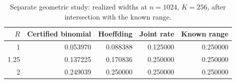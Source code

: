 \begin{table}[htbp]
\centering
\begin{tabular}{rrrrr}
\toprule
$R$ & Certified binomial & Hoeffding & Joint rate & Known range \\
\midrule
1 & 0.053970 & 0.088388 & 0.125000 & 0.250000 \\
1.25 & 0.137225 & 0.170836 & 0.250000 & 0.250000 \\
2 & 0.249039 & 0.250000 & 0.250000 & 0.250000 \\
\bottomrule
\end{tabular}
\caption{Separate geometric study: realized widths at $n=1024$, $K=256$, after intersection with the known range.}
\label{tab:finite}
\end{table}
